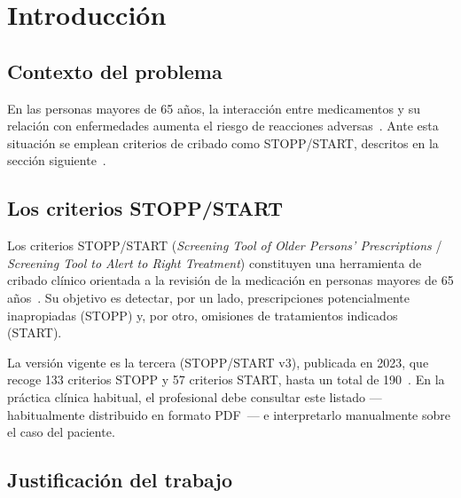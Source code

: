 %

\chapter{Introducción}
\label{cap:introduccion}

\section{Contexto del problema}

En las personas mayores de 65 años, la interacción entre medicamentos y su relación con
enfermedades aumenta el riesgo de reacciones adversas~\cite{maher2014polypharmacy}.
Ante esta situación se emplean criterios de cribado como STOPP/START, descritos
en la sección siguiente~\cite{omahony2023stopp}.

\section{Los criterios STOPP/START}

Los criterios STOPP/START (\textit{Screening Tool of Older Persons' Prescriptions} /
\textit{Screening Tool to Alert to Right Treatment}) constituyen una herramienta de
cribado clínico orientada a la revisión de la medicación en personas mayores de 65
años~\cite{omahony2023stopp}. Su objetivo es detectar, por un lado, prescripciones
potencialmente inapropiadas (STOPP) y, por otro, omisiones de tratamientos indicados
(START).

La versión vigente es la tercera (STOPP/START v3), publicada en 2023, que recoge
133 criterios STOPP y 57 criterios START, hasta un total de 190~\cite{omahony2023stopp}.
En la práctica clínica habitual, el profesional debe consultar este listado
---habitualmente distribuido en formato PDF~\cite{sacyl2023stopp}--- e interpretarlo
manualmente sobre el caso del paciente.

\section{Justificación del trabajo}
\label{sec:justificacion}

